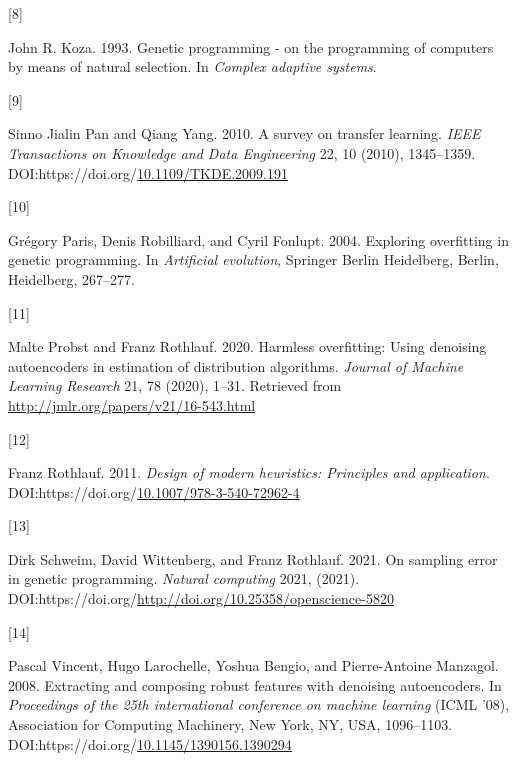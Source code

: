 \documentclass[
  11pt,
]{article}
\newlength{\cslhangindent}
\newlength{\csllabelwidth}
\newlength{\cslentryspacingunit} %
\newenvironment{CSLReferences}[2] %
 {%
  \setlength{\parindent}{0pt}
  \ifodd #1
  \let\oldpar\par
  \def\par{\hangindent=\cslhangindent\oldpar}
  \fi
  \setlength{\parskip}{#2\cslentryspacingunit}
 }%
 {}
\newcommand{\CSLLeftMargin}[1]{\parbox[t]{\csllabelwidth}{#1}}
\newcommand{\CSLRightInline}[1]{\parbox[t]{\linewidth - \csllabelwidth}{#1}\break}
\begin{document}
\begin{CSLReferences}{0}{0}
\leavevmode{}%
\CSLLeftMargin{{[}8{]} }%
\CSLRightInline{John R. Koza. 1993. Genetic programming - on the programming of computers by means of natural selection. In \emph{Complex adaptive systems}.}

\leavevmode{}%
\CSLLeftMargin{{[}9{]} }%
\CSLRightInline{Sinno Jialin Pan and Qiang Yang. 2010. A survey on transfer learning. \emph{IEEE Transactions on Knowledge and Data Engineering} 22, 10 (2010), 1345--1359. DOI:https://doi.org/\href{https://doi.org/10.1109/TKDE.2009.191}{10.1109/TKDE.2009.191}}

\leavevmode{}%
\CSLLeftMargin{{[}10{]} }%
\CSLRightInline{Grégory Paris, Denis Robilliard, and Cyril Fonlupt. 2004. Exploring overfitting in genetic programming. In \emph{Artificial evolution}, Springer Berlin Heidelberg, Berlin, Heidelberg, 267--277.}

\leavevmode{}%
\CSLLeftMargin{{[}11{]} }%
\CSLRightInline{Malte Probst and Franz Rothlauf. 2020. Harmless overfitting: Using denoising autoencoders in estimation of distribution algorithms. \emph{Journal of Machine Learning Research} 21, 78 (2020), 1--31. Retrieved from \url{http://jmlr.org/papers/v21/16-543.html}}

\leavevmode{}%
\CSLLeftMargin{{[}12{]} }%
\CSLRightInline{Franz Rothlauf. 2011. \emph{Design of modern heuristics: Principles and application}. DOI:https://doi.org/\href{https://doi.org/10.1007/978-3-540-72962-4}{10.1007/978-3-540-72962-4}}

\leavevmode{}%
\CSLLeftMargin{{[}13{]} }%
\CSLRightInline{Dirk Schweim, David Wittenberg, and Franz Rothlauf. 2021. On sampling error in genetic programming. \emph{Natural computing} 2021, (2021). DOI:https://doi.org/\url{http://doi.org/10.25358/openscience-5820}}

\leavevmode{}%
\CSLLeftMargin{{[}14{]} }%
\CSLRightInline{Pascal Vincent, Hugo Larochelle, Yoshua Bengio, and Pierre-Antoine Manzagol. 2008. Extracting and composing robust features with denoising autoencoders. In \emph{Proceedings of the 25th international conference on machine learning} (ICML '08), Association for Computing Machinery, New York, NY, USA, 1096--1103. DOI:https://doi.org/\href{https://doi.org/10.1145/1390156.1390294}{10.1145/1390156.1390294}}


\end{CSLReferences}
\end{document}
